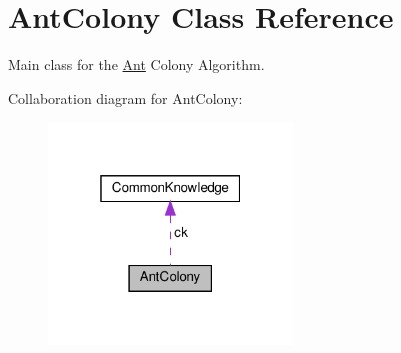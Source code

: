 \hypertarget{classAntColony}{}\section{Ant\+Colony Class Reference}
\label{classAntColony}


Main class for the \hyperlink{classAnt}{Ant} Colony Algorithm.  




Collaboration diagram for Ant\+Colony\+:\nopagebreak
\begin{figure}[H]
\begin{center}
\leavevmode
\includegraphics[width=184pt]{classAntColony__coll__graph}
\end{center}
\end{figure}
